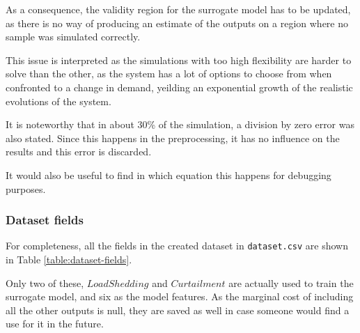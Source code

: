 As a consequence, the validity region for the surrogate model has to be updated, as there is no way of producing an estimate of the outputs on a region where no sample was simulated correctly.

This issue is interpreted as the simulations with too high flexibility are harder to solve than the other, as the system has a lot of options to choose from when confronted to a change in demand, yeilding an exponential growth of the realistic evolutions of the system.

It is noteworthy that in about 30\% of the simulation, a division by zero error was also stated. Since this happens in the preprocessing, it has no influence on the results and this error is discarded.

It would also be useful to find in which equation this happens for debugging purposes.

\subsubsection{Dataset fields}

For completeness, all the fields in the created dataset in \texttt{dataset.csv} are shown in Table \ref{table:dataset-fields}.

Only two of these, $LoadShedding$ and $Curtailment$ are actually used to train the surrogate model, and six as the model features. As the marginal cost of including all the other outputs is null, they are saved as well in case someone would find a use for it in the future.


